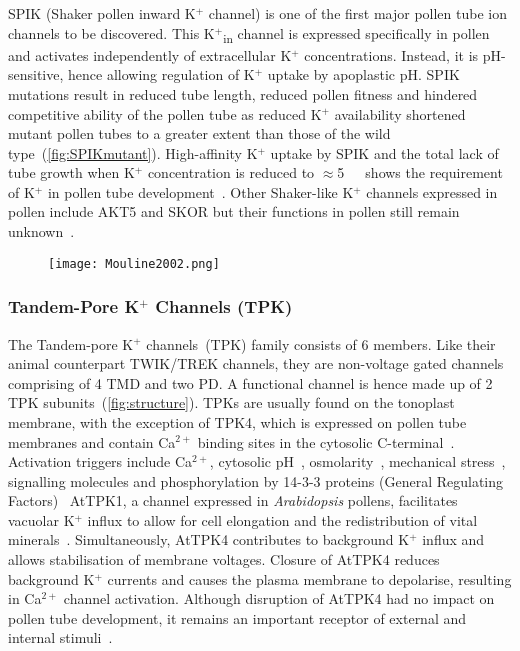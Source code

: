 \documentclass[11pt]{article}
\begin{document}
\begin{multicols*}{2}
SPIK (Shaker pollen inward K$^{+}$ channel) is one of the first major pollen tube ion channels to be discovered. This K$^{+}$\textsubscript{in} channel is expressed specifically in pollen and activates independently of extracellular K$^{+}$ concentrations. Instead, it is pH-sensitive, hence allowing regulation of K$^{+}$ uptake by apoplastic pH. SPIK mutations result in reduced tube length, reduced pollen fitness and hindered competitive ability of the pollen tube as reduced K$^{+}$ availability shortened mutant pollen tubes to a greater extent than those of the wild type~(\autoref{fig:SPIKmutant}). High-affinity K$^{+}$ uptake by SPIK and the total lack of tube growth when K$^{+}$ concentration is reduced to $\approx$5\,\SI{}{\micro\Molar} shows the requirement of K$^{+}$ in pollen tube development~\citep{Mouline2002}. Other Shaker-like K$^{+}$ channels expressed in pollen include AKT5 and SKOR but their functions in pollen still remain unknown~\citep{Chen2008}. 

\begin{figure}[H]
  \centering
    \texttt{[image: Mouline2002.png]}
  \label{fig:SPIKmutant}
\end{figure}

\subsubsection{Tandem-Pore K$^{+}$ Channels (TPK)}
The Tandem-pore K$^{+}$ channels~(TPK) family consists of 6 members. Like their animal counterpart TWIK/TREK channels, they are non-voltage gated channels comprising of 4 TMD and two PD. A functional channel is hence made up of 2 TPK subunits~(\autoref{fig:structure}). TPKs are usually found on the tonoplast membrane, with the exception of TPK4, which is expressed on pollen tube membranes and contain Ca$^{2+}$ binding sites in the cytosolic C-terminal~\citep{Czempinski1997}. Activation triggers include Ca$^{2+}$, cytosolic pH~\citep{Latz2007}, osmolarity~\citep{Maathuis2011}, mechanical stress~\citep{Bagriantsev2011}, signalling molecules and phosphorylation by 14-3-3 proteins (General Regulating Factors)~\citep{Voelker2010}
\newline\newline
AtTPK1, a channel expressed in \textit{Arabidopsis} pollens, facilitates vacuolar K$^{+}$ influx to allow for cell elongation and the redistribution of vital minerals~\citep{Gobert2007,Maitrejean2011}. Simultaneously, AtTPK4 contributes to background K$^{+}$ influx and allows stabilisation of membrane voltages. Closure of AtTPK4 reduces background K$^{+}$ currents and causes the plasma membrane to depolarise, resulting in Ca$^{2+}$ channel activation. Although disruption of AtTPK4 had no impact on pollen tube development, it remains an important receptor of external and internal stimuli~\citep{Becker2004a}.


\end{multicols*}
\end{document}
